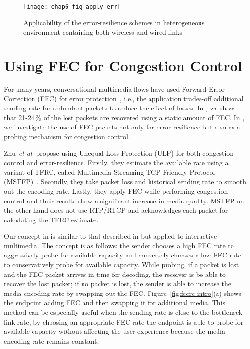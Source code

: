 \begin{figure}
\centerline {
\texttt{[image: chap6-fig-apply-err]}
}
\caption{Applicability of the error-resilience schemes in heterogeneous
environment containing both wireless and wired links.}
\label{fig:apply_err}
\end{figure}


\section{Using FEC for Congestion Control}

For many years, conversational multimedia flows have used Forward Error
Correction (FEC) for error protection~\cite{855913, 664283}, i.e., the
application trades-off additional sending rate for redundant packets to reduce
the effect of losses. In , we show that 21-24\,\% of the lost
packets are recovered using a static amount of FEC. In , we
investigate the use of FEC packets not only for error-resilience but also as a
probing mechanism for congestion control.

Zhu~\textit{et al.}\cite{Zhu:2001tu,springerlink:1022865704606} propose using
Unequal Loss Protection (ULP) for both congestion control and error-resilience. 
Firstly, they estimate the available rate using a variant of TFRC,
called Multimedia Streaming TCP-Friendly Protocol (MSTFP)~\cite{871542}.
Secondly, they take packet loss and historical sending rate to smooth out the
encoding rate. Lastly, they apply FEC while performing congestion control and
their results show a significant increase in media quality. MSTFP on the other
hand does not use RTP/RTCP and acknowledges each packet for calculating the
TFRC estimate.

Our concept in  is similar to that described in
\cite{Zhu:2001tu} but applied to interactive multimedia. The concept is as
follows: the sender chooses a high FEC rate to aggressively probe for
available capacity and conversely chooses a low FEC rate to conservatively
probe for available capacity. While probing, if a packet is lost and the FEC
packet arrives in time for decoding, the receiver is be able to recover the
lost packet; if no packet is lost, the sender is able to increase the media
encoding rate by swapping out the FEC. Figure~\ref{fig:fecrc-intro}(a) shows
the endpoint adding FEC and then swapping it for additional media. This method
can be especially useful when the sending rate is close to the bottleneck link
rate, by choosing an appropriate FEC rate the endpoint is able to probe for
available capacity without affecting the user-experience because the media
encoding rate remains constant.

